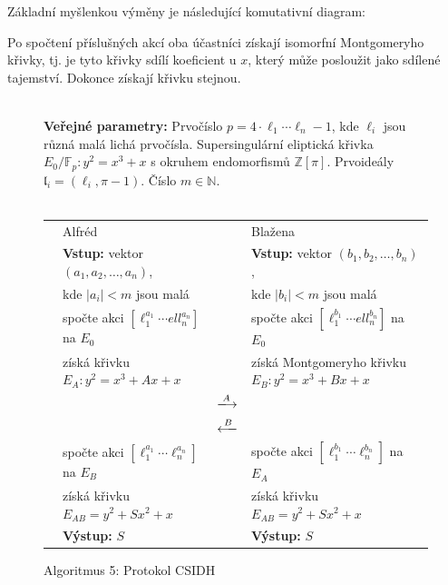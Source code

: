 \documentclass[12pt]{report}
\begin{document}
Základní myšlenkou výměny je následující komutativní diagram:
\begin{figure}[h]
\begin{center} 
\end{center}
\end{figure}

Po spočtení příslušných akcí oba účastníci získají isomorfní Montgomeryho křivky, tj. je tyto křivky sdílí koeficient u $x$, který může posloužit jako sdílené tajemství. Dokonce získají křivku stejnou.

\begin{figure}[h]
\begin{center} 
\makebox[1cm]{\rule{17.3cm}{0.4pt}}\\
\hspace{-1.35cm} \textbf{Veřejné parametry:} Prvočíslo $p = 4 \cdot \ell_1 \cdots \ell_n - 1$, kde $\ell_i$ jsou různá malá lichá prvočísla. Supersingulární eliptická křivka $E_0/\mathbb{F}_p : y^2 = x^3+x$ s okruhem endomorfismů $\mathbb{Z}[\pi]$. Prvoideály $\mathfrak{l}_i = (\ell_i, \pi - 1)$. Číslo $m \in \mathbb{N}$.\\

\vspace{-0.25cm}
\makebox[\linewidth]{\rule{17.3cm}{0.4pt}}\\
\vspace{0.2cm}
\hspace*{-1cm}\begin{tabular}{l l c l}
 \cline{2-2} \cline{4-4} 
& Alfréd & & Blažena \\ 
\cline{2-2} \cline{4-4} 
& \textbf{Vstup:} vektor $(a_1,a_2,\dots,a_n)$,  & &  \textbf{Vstup:} vektor $(b_1,b_2,\dots,b_n)$,\\
&kde $\vert a_i \vert < m$ jsou malá & &kde $\vert b_i \vert < m$ jsou malá\\
&spočte akci $[\ell_1 ^{a_1}\cdots ell_n ^{a_n}]$ na $E_0$ & &spočte akci $[\ell_1 ^{b_1} \cdots ell_n ^{b_n}]$ na $E_0$\\
&získá křivku $E_A : y^2 = x^3 + Ax + x$& &získá Montgomeryho křivku $E_B: y^2 = x^3 + Bx + x$\\
 & & $\xlongrightarrow{A}$  &  \\
&  & $\xlongleftarrow{B} $ &  \\
& spočte akci $[\ell_1 ^{a_1} \cdots \ell_n ^{a_n}]$ na $E_B$ & & spočte akci $[\ell_1 ^{b_1} \cdots \ell_n ^{b_n}]$ na $E_A$\\
& získá křivku $E_{AB} = y^2 + Sx^2 + x$ &  & získá křivku $E_{AB} = y^2 + Sx^2 + x$ \\
& \textbf{Výstup:} $S$ & & \textbf{Výstup:} $S$
\end{tabular}
\caption*{Algoritmus 5: Protokol CSIDH}
\end{center}
\end{figure}
\end{document}
